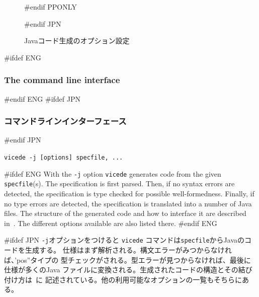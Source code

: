 \documentclass[\pformat,12pt]{article}
\newcommand{\vdmde}{vdmde}
\newcommand{\vdmde}{vppde}
\renewcommand{\vdmde}{vicede}
\begin{document}
\begin{figure}[tbh]
\begin{center}
#endif PPONLY
\caption{Javaコード生成のオプション設定}
#endif JPN
\label{fig:optjcg}
\end{center}
\end{figure}

#ifdef ENG
\subsubsection{The command line interface}
#endif ENG
#ifdef JPN
\subsubsection{コマンドラインインターフェース}
#endif JPN

{\tt \vdmde\ -j [options] specfile, ...}

#ifdef ENG
With the {\tt -j} option {\tt \vdmde} generates code from the given
{\tt specfile}(s). The specification is first parsed. Then, if no
syntax errors are detected, the specification is type checked for
possible well-formedness. Finally,
if no type errors are detected, the specification is translated into a
number of Java files. The structure of the generated
code and how to interface it are described in~\cite{CGJavaManPP-SCSK}. The
different options available are also listed there.
#endif ENG

#ifdef JPN
{\tt -j}オプションをつけると {\tt \vdmde} コマンドは{\tt specfile}からJavaのコードを生成する。
仕様はまず解析される。構文エラーがみつからなければ、'pos''タイプの 
型チェックがされる。型エラーが見つからなければ、最後に仕様が多くのJava
ファイルに変換される。生成されたコードの構造とその結び付け方は~\cite{CGJavaManPP-SCSK}に
記述されている。他の利用可能なオプションの一覧もそちらにある。
\end{document}
